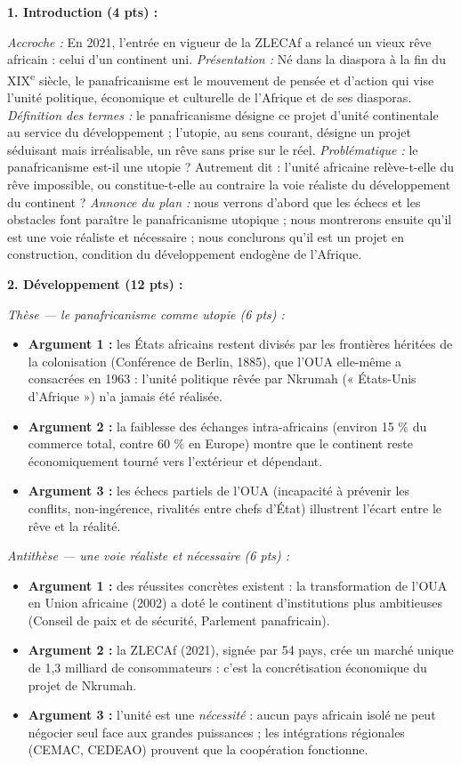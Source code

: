 \documentclass[11pt]{article}
\newcommand{\cle}[1]{{\popxbold\color{popdark}#1}}
\begin{document}
\begin{corrige}
\textbf{1. Introduction (4 pts) :}

\emph{Accroche :} En 2021, l'entrée en vigueur de la ZLECAf a relancé un vieux rêve africain : celui d'un continent uni. \emph{Présentation :} Né dans la diaspora à la fin du XIX\textsuperscript{e} siècle, le panafricanisme est le mouvement de pensée et d'action qui vise l'unité politique, économique et culturelle de l'Afrique et de ses diasporas. \emph{Définition des termes :} le \cle{panafricanisme} désigne ce projet d'unité continentale au service du développement ; l'\cle{utopie}, au sens courant, désigne un projet séduisant mais irréalisable, un rêve sans prise sur le réel. \emph{Problématique :} le panafricanisme est-il une utopie ? Autrement dit : l'unité africaine relève-t-elle du rêve impossible, ou constitue-t-elle au contraire la voie réaliste du développement du continent ? \emph{Annonce du plan :} nous verrons d'abord que les échecs et les obstacles font paraître le panafricanisme utopique ; nous montrerons ensuite qu'il est une voie réaliste et nécessaire ; nous conclurons qu'il est un projet en construction, condition du développement endogène de l'Afrique.

\textbf{2. Développement (12 pts) :}

\emph{Thèse — le panafricanisme comme utopie (6 pts) :}
\begin{itemize}
\item \textbf{Argument 1 :} les États africains restent divisés par les frontières héritées de la colonisation (Conférence de Berlin, 1885), que l'OUA elle-même a consacrées en 1963 : l'unité politique rêvée par Nkrumah (« États-Unis d'Afrique ») n'a jamais été réalisée.
\item \textbf{Argument 2 :} la faiblesse des échanges intra-africains (environ 15 \% du commerce total, contre 60 \% en Europe) montre que le continent reste économiquement tourné vers l'extérieur et dépendant.
\item \textbf{Argument 3 :} les échecs partiels de l'OUA (incapacité à prévenir les conflits, non-ingérence, rivalités entre chefs d'État) illustrent l'écart entre le rêve et la réalité.
\end{itemize}

\emph{Antithèse — une voie réaliste et nécessaire (6 pts) :}
\begin{itemize}
\item \textbf{Argument 1 :} des réussites concrètes existent : la transformation de l'OUA en Union africaine (2002) a doté le continent d'institutions plus ambitieuses (Conseil de paix et de sécurité, Parlement panafricain).
\item \textbf{Argument 2 :} la ZLECAf (2021), signée par 54 pays, crée un marché unique de 1,3 milliard de consommateurs : c'est la concrétisation économique du projet de Nkrumah.
\item \textbf{Argument 3 :} l'unité est une \emph{nécessité} : aucun pays africain isolé ne peut négocier seul face aux grandes puissances ; les intégrations régionales (CEMAC, CEDEAO) prouvent que la coopération fonctionne.
\end{itemize}


\end{corrige}
\end{document}

